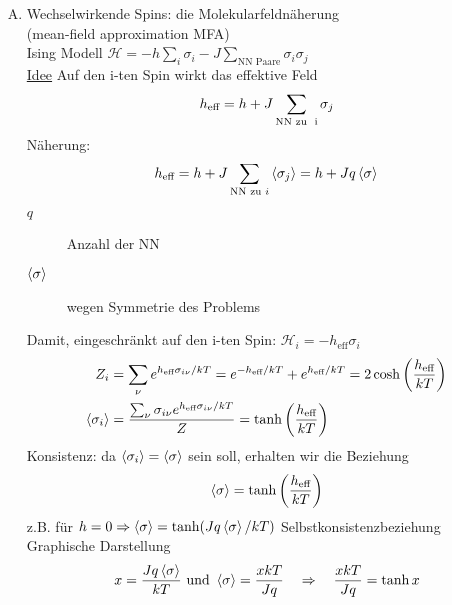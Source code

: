 \begin{enumerate}[A)]
    \item Wechselwirkende Spins: die Molekularfeldnäherung \\
    (mean-field approximation MFA) \\
    Ising Modell $\mathscr{H} = - h \sum_i \sigma_i - J \sum_{\text{NN Paare}} \sigma_i \sigma_j$ \\
    \underline{Idee} Auf den i-ten Spin wirkt das effektive Feld
    \begin{equation}
        h_\text{eff} = h + J \sum_\text{\text{NN zu } i} \sigma_j
    \end{equation}
    Näherung:
    \begin{equation}
        h_\text{eff} = h + J \sum_{\text{NN zu } i} \left\langle\sigma_j\right\rangle = h + J q \left\langle\sigma\right\rangle
    \end{equation}
    \begin{description}
        \item[$q$] Anzahl der NN
        \item[$\left\langle\sigma\right\rangle$] wegen Symmetrie des Problems
    \end{description}
    Damit, eingeschränkt auf den i-ten Spin: $\mathscr{H}_i = - h_\text{eff} \sigma _i$
    \begin{equation}
        \begin{split}
            Z_i &= \sum_\nu e^{h_\text{eff} \sigma_{i \nu} / kT} = e^{-h_\text{eff} / kT} + e^{h_\text{eff} / k T} = 2 \cosh \left( \frac{h_\text{eff}}{kT} \right) \\
            \left\langle\sigma_i\right\rangle &= \frac{\sum_\nu \sigma_{i \nu} e^{h_\text{eff} \sigma_{i \nu} / k T}}{Z} = \tanh \left( \frac{h_\text{eff}}{k T} \right)
        \end{split}
    \end{equation}
    Konsistenz: da $\left\langle\sigma_i\right\rangle = \left\langle\sigma\right\rangle$ sein soll, erhalten wir die Beziehung
    \begin{equation}
        \left\langle\sigma\right\rangle = \tanh \left( \frac{h_\text{eff}}{k T} \right)
    \end{equation}
    z.B. für $h = 0 \Rightarrow \left\langle\sigma\right\rangle = \tanh (J q \left\langle\sigma\right\rangle / k T)$ Selbstkonsistenzbeziehung \\
    Graphische Darstellung
    \begin{equation}
        x = \frac{ J q \left\langle\sigma\right\rangle}{k T} \text{  und  } \left\langle\sigma\right\rangle = \frac{x k T}{J q} \quad \Rightarrow \quad \frac{x k T}{J q} = \tanh x
    \end{equation}
    \begin{figure}[H]
        \centering

\end{figure}
\end{enumerate}
